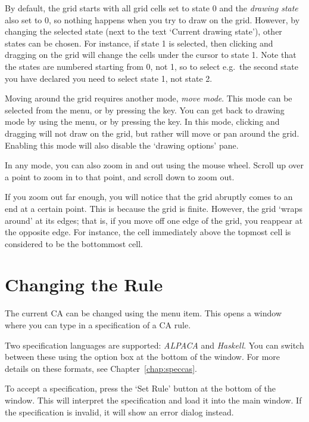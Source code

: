 \documentclass[oneside,a4paper]{memoir}
\begin{document}
By default, the grid starts with all grid cells set to state 0 and the \emph{drawing state} also set to 0,
  so nothing happens when you try to draw on the grid.
However, by changing the selected state (next to the text `Current drawing state'), other states can be chosen.
For instance, if state 1 is selected, then clicking and dragging on the grid will change the cells under the cursor to state 1.
Note that the states are numbered starting from 0, not 1,
  so to select e.g.\ the second state you have declared you need to select state 1, not state 2.

Moving around the grid requires another mode, \emph{move mode}.
This mode can be selected from the  menu, or by pressing the  key.
You can get back to drawing mode by using the  menu, or by pressing the  key.
In this mode, clicking and dragging will not draw on the grid, but rather will move or pan around the grid.
Enabling this mode will also disable the `drawing options' pane.

In any mode, you can also zoom in and out using the mouse wheel.
Scroll up over a point to zoom in to that point, and scroll down to zoom out.

If you zoom out far enough, you will notice that the grid abruptly comes to an end at a certain point.
This is because the grid is finite.
However, the grid `wraps around' at its edges; that is, if you move off one edge of the grid, you reappear at the opposite edge.
For instance, the cell immediately above the topmost cell is considered to be the bottommost cell.

\section{Changing the Rule}
\label{sec:chngrule}

The current CA can be changed using the  menu item.
This opens a window where you can type in a specification of a CA rule.

Two specification languages are supported: \emph{ALPACA} and \emph{Haskell}.
You can switch between these using the option box at the bottom of the window.
For more details on these formats, see Chapter~\ref{chap:speccas}.

To accept a specification, press the `Set Rule' button at the bottom of the window.
This will interpret the specification and load it into the main window.
If the specification is invalid, it will show an error dialog instead.
\end{document}
